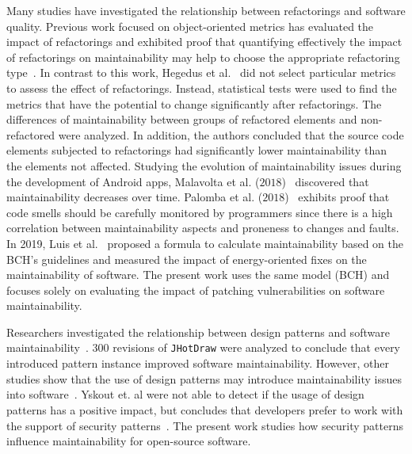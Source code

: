 \documentclass[10pt,conference]{IEEEtran}
\begin{document}
Many studies have investigated the relationship between refactorings and
software quality. Previous work focused on object-oriented metrics has evaluated the
impact of refactorings and exhibited proof that quantifying effectively the
impact of refactorings on maintainability may help to choose the appropriate
refactoring type~\cite{1167822}. In contrast to this work, Hegedus et
al.~\cite{HEGEDUS2018313} did not select particular metrics to assess the effect
of refactorings. Instead, statistical tests were used to find the metrics that
have the potential to change significantly after refactorings. The differences
of maintainability between groups of refactored elements and non-refactored were
analyzed. In addition, the authors concluded that the source code elements
subjected to refactorings had significantly lower maintainability than the
elements not affected. Studying the evolution of maintainability issues during
the development of Android apps, Malavolta et al. ($2018$)~\cite{8530041}
discovered that maintainability decreases over time. Palomba et al.
($2018$)~\cite{Palomba:2018:DIM:3231288.3231337} exhibits proof that code smells
should be carefully monitored by programmers since there is a high correlation
between maintainability aspects and proneness to changes and faults. In 2019, Luis et 
al.~\cite{cruz2019energyoriented} proposed a formula to calculate maintainability 
based on the BCH's guidelines and measured the impact of energy-oriented fixes 
on the maintainability of software.
The present work uses the same model (BCH) and focuses solely on evaluating 
the impact of patching vulnerabilities on software maintainability.

Researchers investigated the relationship between design patterns and software
maintainability~\cite{10.1007/978-3-642-35267-6-18}. $300$ revisions of
\texttt{JHotDraw} were analyzed to conclude that every introduced pattern
instance improved software maintainability. However, other studies show that the
use of design patterns may introduce maintainability issues into
software~\cite{4493325}. Yskout et. al were not able to detect if the usage of 
design patterns has a positive impact, but concludes that developers prefer to 
work with the support of security patterns~\cite{8077802}. The present work 
studies how security patterns influence maintainability for open-source software.
\end{document}
